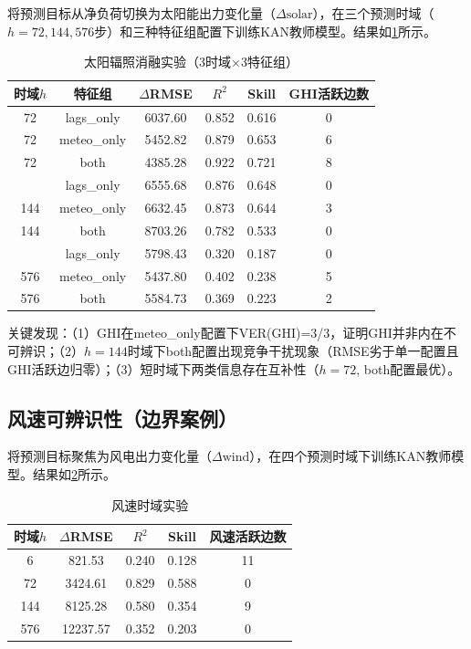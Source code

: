 将预测目标从净负荷切换为太阳能出力变化量（$\Delta\text{solar}$），在三个预测时域（$h=72, 144, 576$步）和三种特征组配置下训练KAN教师模型。结果如\cref{tab:solar-ablation}所示。

\begin{table}[htbp]
\centering
\caption{太阳辐照消融实验（3时域$\times$3特征组）}
\label{tab:solar-ablation}
\begin{tabular}{cccccc}
\toprule
时域$h$ & 特征组 & $\Delta$RMSE & $R^2$ & Skill & GHI活跃边数 \\
\midrule
72 & lags\_only & 6037.60 & 0.852 & 0.616 & 0 \\
72 & meteo\_only & 5452.82 & 0.879 & 0.653 & 6 \\
72 & both & 4385.28 & 0.922 & 0.721 & 8 \\
\addlinespace
144 & lags\_only & 6555.68 & 0.876 & 0.648 & 0 \\
144 & meteo\_only & 6632.45 & 0.873 & 0.644 & 3 \\
144 & both & 8703.26 & 0.782 & 0.533 & 0 \\
\addlinespace
576 & lags\_only & 5798.43 & 0.320 & 0.187 & 0 \\
576 & meteo\_only & 5437.80 & 0.402 & 0.238 & 5 \\
576 & both & 5584.73 & 0.369 & 0.223 & 2 \\
\bottomrule
\end{tabular}
\end{table}

关键发现：（1）GHI在meteo\_only配置下VER(GHI)=3/3，证明GHI并非内在不可辨识；（2）$h=144$时域下both配置出现竞争干扰现象（RMSE劣于单一配置且GHI活跃边归零）；（3）短时域下两类信息存在互补性（$h=72$, both配置最优）。

\subsection{风速可辨识性（边界案例）}

将预测目标聚焦为风电出力变化量（$\Delta\text{wind}$），在四个预测时域下训练KAN教师模型。结果如\cref{tab:wind-ablation}所示。

\begin{table}[htbp]
\centering
\caption{风速时域实验}
\label{tab:wind-ablation}
\begin{tabular}{ccccc}
\toprule
时域$h$ & $\Delta$RMSE & $R^2$ & Skill & 风速活跃边数 \\
\midrule
6 & 821.53 & 0.240 & 0.128 & 11 \\
72 & 3424.61 & 0.829 & 0.588 & 0 \\
144 & 8125.28 & 0.580 & 0.354 & 9 \\
576 & 12237.57 & 0.352 & 0.203 & 0 \\
\bottomrule
\end{tabular}
\end{table}

